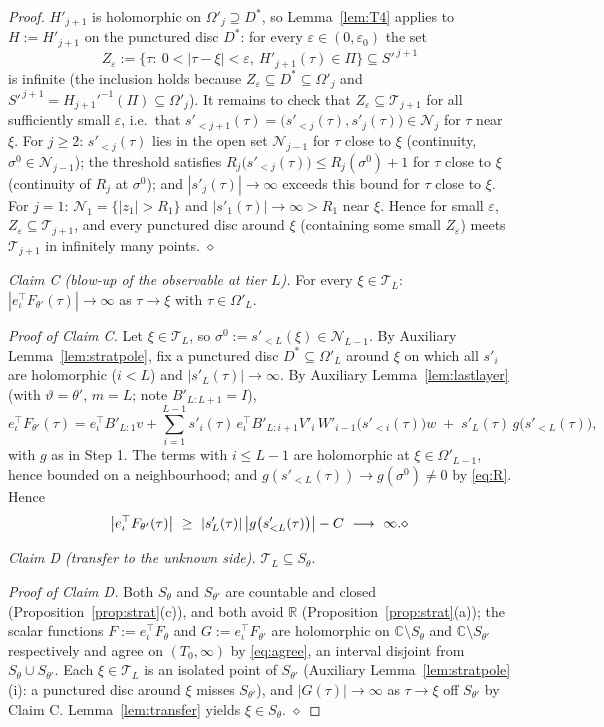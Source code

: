 \documentclass[11pt]{article}
\theoremstyle{definition}
\theoremstyle{remark}
\theoremstyle{plain}
\newcommand{\R}{\mathbb{R}}
\newcommand{\C}{\mathbb{C}}
\newcommand{\cN}{\mathcal{N}}
\newcommand{\cT}{\mathcal{T}}
\begin{document}
\begin{proof}
$H'_{j+1}$ is holomorphic on $\Omega'_j\supseteq D^*$, so Lemma~\ref{lem:T4} applies to
$H:=H'_{j+1}$ on the punctured disc $D^*$: for every $\varepsilon\in(0,\varepsilon_0)$
the set
\[
Z_\varepsilon:=\{\tau:\ 0<|\tau-\xi|<\varepsilon,\ H'_{j+1}(\tau)\in\Pi\}
\subseteq S'^{\,j+1}
\]
is infinite (the inclusion holds because $Z_\varepsilon\subseteq D^*\subseteq\Omega'_j$
and $S'^{\,j+1}=H_{j+1}'^{-1}(\Pi)\subseteq\Omega'_j$).  It remains to check that
$Z_\varepsilon\subseteq\cT_{j+1}$ for all sufficiently small $\varepsilon$, i.e.\ that
$s'_{<j+1}(\tau)=\big(s'_{<j}(\tau),s'_j(\tau)\big)\in\cN_j$ for $\tau$ near $\xi$.
For $j\ge2$: $s'_{<j}(\tau)$ lies in the open set $\cN_{j-1}$ for $\tau$ close to
$\xi$ (continuity, $\sigma^0\in\cN_{j-1}$); the threshold satisfies
$R_j\big(s'_{<j}(\tau)\big)\le R_j(\sigma^0)+1$ for $\tau$ close to $\xi$ (continuity of
$R_j$ at $\sigma^0$); and $|s'_j(\tau)|\to\infty$ exceeds this bound for $\tau$ close to
$\xi$.  For $j=1$: $\cN_1=\{|z_1|>R_1\}$ and $|s'_1(\tau)|\to\infty>R_1$ near $\xi$.
Hence for small $\varepsilon$, $Z_\varepsilon\subseteq\cT_{j+1}$, and every punctured
disc around $\xi$ (containing some small $Z_\varepsilon$) meets $\cT_{j+1}$ in
infinitely many points.  \hfill$\diamond$

\emph{Claim C (blow-up of the observable at tier $L$).}  For every $\xi\in\cT_L$:
$|e_\iota^\top F_{\theta'}(\tau)|\to\infty$ as $\tau\to\xi$ with $\tau\in\Omega'_L$.

\emph{Proof of Claim C.}  Let $\xi\in\cT_L$, so $\sigma^0:=s'_{<L}(\xi)\in\cN_{L-1}$.
By Auxiliary Lemma~\ref{lem:stratpole}, fix a punctured disc
$D^*\subseteq\Omega'_L$ around $\xi$ on which all $s'_i$ are holomorphic ($i<L$) and
$|s'_L(\tau)|\to\infty$.  By Auxiliary Lemma~\ref{lem:lastlayer} (with
$\vartheta=\theta'$, $m=L$; note $B'_{L:L+1}=I$),
\[
e_\iota^\top F_{\theta'}(\tau)
=e_\iota^\top B'_{L:1}v
+\sum_{i=1}^{L-1}s'_i(\tau)\,e_\iota^\top B'_{L:i+1}V'_i\,W'_{i-1}\big(s'_{<i}(\tau)\big)w
\;+\;s'_L(\tau)\,g\big(s'_{<L}(\tau)\big),
\]
with $g$ as in Step 1.  The terms with $i\le L-1$ are holomorphic at
$\xi\in\Omega'_{L-1}$, hence bounded on a neighbourhood; and
$g(s'_{<L}(\tau))\to g(\sigma^0)\neq0$ by \eqref{eq:R}.  Hence
\[
\big|e_\iota^\top F_{\theta'}(\tau)\big|
\ \ge\ |s'_L(\tau)|\,\big|g\big(s'_{<L}(\tau)\big)\big|-C
\ \longrightarrow\ \infty .  \hfill\diamond
\]

\emph{Claim D (transfer to the unknown side).}  $\cT_L\subseteq S_\theta$.

\emph{Proof of Claim D.}  Both $S_\theta$ and $S_{\theta'}$ are countable and closed
(Proposition~\ref{prop:strat}(c)), and both avoid $\R$
(Proposition~\ref{prop:strat}(a)); the scalar functions $F:=e_\iota^\top F_\theta$ and
$G:=e_\iota^\top F_{\theta'}$ are holomorphic on $\C\setminus S_\theta$ and
$\C\setminus S_{\theta'}$ respectively and agree on $(T_0,\infty)$ by \eqref{eq:agree},
an interval disjoint from $S_\theta\cup S_{\theta'}$.  Each $\xi\in\cT_L$ is an isolated
point of $S_{\theta'}$ (Auxiliary Lemma~\ref{lem:stratpole}(i): a punctured disc around
$\xi$ misses $S_{\theta'}$), and $|G(\tau)|\to\infty$ as $\tau\to\xi$ off $S_{\theta'}$
by Claim C.  Lemma~\ref{lem:transfer} yields $\xi\in S_\theta$.  \hfill$\diamond$


\end{proof}
\end{document}
